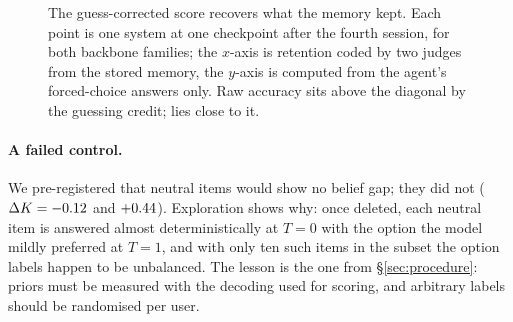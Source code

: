 \begin{figure}[t]
\centering

\caption{The guess-corrected score recovers what the memory kept. Each point is one system at one checkpoint after the
fourth session, for both backbone families; the $x$-axis is
retention coded by two judges from the stored memory, the
$y$-axis is computed from the agent's forced-choice answers only. Raw accuracy sits above the diagonal by the guessing
credit; \pcs{} lies close to it.}
\label{fig:pcs}
\end{figure}

\paragraph{A failed control.} We pre-registered that neutral items would show no belief gap; they did not
($\Delta K=-0.12$ and $+0.44$). Exploration shows why: once deleted, each neutral item is answered
almost deterministically at $T{=}0$ with the option the model mildly preferred at $T{=}1$, and with only ten such items in
the subset the option labels happen to be unbalanced. The lesson is the one from \S\ref{sec:procedure}: priors must be
measured with the decoding used for scoring, and arbitrary labels should be randomised per user.
